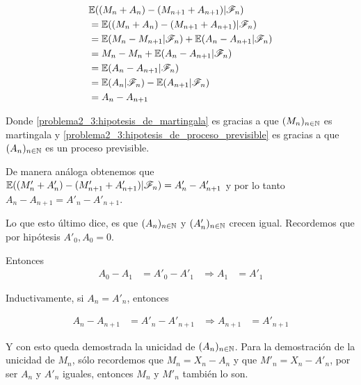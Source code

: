 \begin{align}
                                                    & \mathbb{E}((M_n + A_n) -( M_{n+1} + A_{n+1}) | \mathscr{F}_n)                                              \\ 
                                                    &=  \mathbb{E}((M_n + A_n) -( M_{n+1} + A_{n+1}) | \mathscr{F}_n)                                            \\
                                                    &=  \mathbb{E}(M_n - M_{n+1}| \mathscr{F}_n) + \mathbb{E}(A_n - A_{n+1} | \mathscr{F}_n)                                      \\
                                                    &=  M_n - M_{n} + \mathbb{E}(A_n - A_{n+1} | \mathscr{F}_n) \label{problema2_3:hipotesis_de_martingala}      \\
                                                    &=  \mathbb{E}(A_n - A_{n+1} | \mathscr{F}_n)                                                                \\
                                                    &=  \mathbb{E}(A_n| \mathscr{F}_n) - \mathbb{E}(A_{n+1} | \mathscr{F}_n)                                                      \\
                                                    &=  A_n - A_{n+1} \label{problema2_3:hipotesis_de_proceso_previsible}                                                                               
\end{align}\par\null

Donde \eqref{problema2_3:hipotesis_de_martingala} es gracias a que $(M_n)_{n\in\mathbb{N}}$ es martingala y \eqref{problema2_3:hipotesis_de_proceso_previsible}
es gracias a que $(A_n)_{n\in\mathbb{N}}$ es un proceso previsible.\par\null

De manera análoga obtenemos que $\mathbb{E}((M'_n + A'_n) - (M'_{n+1} + A'_{n+1}) | \mathscr{F}_n) = A'_n - A'_{n+1}$ y por lo tanto $A_n - A_{n+1} = A'_n - A'_{n+1}$.\par\null

Lo que esto último dice, es que $(A_n)_{n\in\mathbb{N}}$ y $(A'_n)_{n\in\mathbb{N}}$ crecen igual. Recordemos que por hipótesis $A'_0, A_0 = 0$.\par\null

Entonces
\begin{align}
    A_0 - A_1 &= A'_0 - A'_1 &\Rightarrow A_1 &= A'_1
\end{align}\par\null

Inductivamente, si $A_n = A'_n$, entonces
           
\begin{align}
    A_n - A_{n+1} &= A'_n - A'_{n+1} &\Rightarrow A_{n+1} &= A'_{n+1}
\end{align}                                                                                                         

Y con esto queda demostrada la unicidad de $(A_n)_{n\in\mathbb{N}}$. Para la demostración de la unicidad de $M_n$, sólo recordemos que 
$M_n = X_n - A_n$ y que $M'_n = X_n - A'_n$, por ser $A_n$ y $A'_n$ iguales, entonces $M_n$ y $M'_n$ también lo son.